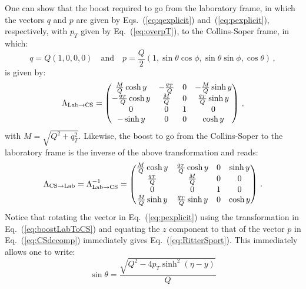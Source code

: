 \documentclass[10pt,a4paper]{article}
\begin{document}
One can show that the boost required to go from the laboratory frame,
in which the vectors $q$ and $p$ are given by
Eqs.~(\ref{eq:qexplicit}) and~(\ref{eq:pexplicit}), respectively, with
$p_T$ given by Eq.~(\ref{eq:overpT}), to the Collins-Soper frame, in
which:
\begin{equation}\label{eq:CSdecomp}
q = Q(1,0,0,0)\quad\mbox{and}\quad p = \frac{Q}2(1,\sin\theta\cos\phi, \sin\theta\sin\phi,\cos\theta)\,,
\end{equation}
is given by:
\begin{equation}\label{eq:boostLabToCS}
\Lambda_{{\rm Lab}\rightarrow {\rm CS}} = 
\begin{pmatrix}
\frac{M}{Q}\cosh y & -\frac{q_T}{Q} & 0 & -\frac{M}{Q}\sinh y\\
-\frac{q_T}{Q}\cosh y & \frac{M}{Q} & 0 & \frac{q_T}{Q}\sinh y\\
0 & 0 & 1 & 0 \\
-\sinh y & 0 & 0 & \cosh y
\end{pmatrix}\,,
\end{equation}
with $M=\sqrt{Q^2+q_T^2}$. Likewise, the boost to go from the
Collins-Soper to the laboratory frame is the inverse of the above
transformation and reads:
\begin{equation}\label{eq:boostCSToLab}
\Lambda_{ {\rm CS}\rightarrow{\rm Lab}} = \Lambda_{{\rm Lab}\rightarrow {\rm CS}}^{-1}=
\begin{pmatrix}
\frac{M}{Q}\cosh y & \frac{q_T}{Q}\cosh y & 0 & \sinh y\\
\frac{q_T}{Q} & \frac{M}{Q} & 0 & 0\\
0 & 0 & 1 & 0 \\
\frac{M}{Q}\sinh y & \frac{q_T}{Q}\sinh y & 0 & \cosh y
\end{pmatrix}\,.
\end{equation}
Notice that rotating the vector in Eq.~(\ref{eq:pexplicit}) using the
transformation in Eq.~(\ref{eq:boostLabToCS}) and equating the $z$
component to that of the vector $p$ in Eq.~(\ref{eq:CSdecomp})
immediately gives Eq.~(\ref{eq:RitterSport}). This immediately allows
one to write:
\begin{equation}
\sin\theta = \frac{\sqrt{Q^2-4p_T\sinh^2(\eta-y)}}{Q}
\end{equation}



\newpage
\end{document}
